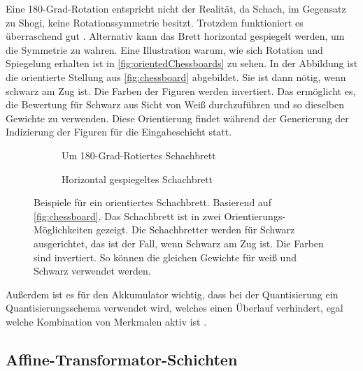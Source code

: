 Eine 180-Grad-Rotation entspricht nicht der Realität, da Schach, im Gegensatz zu Shogi, keine Rotationssymmetrie besitzt. Trotzdem funktioniert es überraschend gut \cite{StockfishNNUE}. Alternativ kann das Brett horizontal gespiegelt werden, um die Symmetrie zu wahren. Eine Illustration warum, wie sich Rotation und Spiegelung erhalten ist in \autoref{fig:orientedChessboards} zu sehen. In der Abbildung ist die orientierte Stellung aus \autoref{fig:chessboard} abgebildet. Sie ist dann nötig, wenn schwarz am Zug ist. Die Farben der Figuren werden invertiert. Das ermöglicht es, die Bewertung für Schwarz aus Sicht von Weiß durchzuführen und so dieselben Gewichte zu verwenden. Diese Orientierung findet während der Generierung der Indizierung der Figuren für die Eingabeschicht statt.

\begin{figure}
  \centering
  \begin{subfigure}{.5\textwidth}
    \centering
    \resizebox{.9\textwidth}{!}{%
      \chessboard[setfen={8/8/6k1/5N2/3p4/8/3K4/8 b}]
    }
    \caption{Um 180-Grad-Rotiertes Schachbrett}
    \label{fig:rotatedChessboard}
  \end{subfigure}%
  \begin{subfigure}{.5\textwidth}
    \centering
    \resizebox{.9\textwidth}{!}{%
      \chessboard[setfen={8/8/1k6/2N5/4p3/8/4K3/8 b}]
    }
    \caption{Horizontal gespiegeltes Schachbrett}
    \label{fig:flippedChessboard}
  \end{subfigure}
  \caption{Beispiele für ein orientiertes Schachbrett. Basierend auf \autoref{fig:chessboard}. Das Schachbrett ist in zwei Orientierungs-Möglichkeiten gezeigt. Die Schachbretter werden für Schwarz ausgerichtet, das ist der Fall, wenn Schwarz am Zug ist. Die Farben sind invertiert. So können die gleichen Gewichte für weiß und Schwarz verwendet werden.}
  \label{fig:orientedChessboards}
\end{figure}

Außerdem ist es für den Akkumulator wichtig, dass bei der Quantisierung ein Quantisierungsschema verwendet wird, welches einen Überlauf verhindert, egal welche Kombination von Merkmalen aktiv ist \cite{StockfishNNUE}.

\subsection{Affine-Transformator-Schichten}

